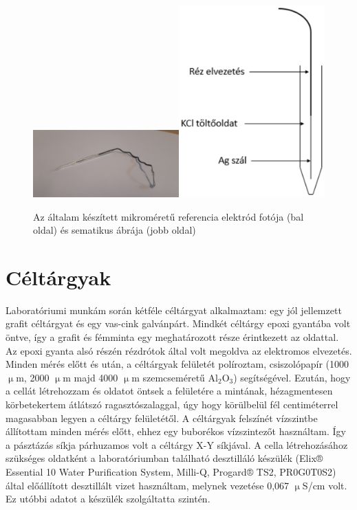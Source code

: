 \begin{figure}
\centering
\includegraphics[width=0.5\textwidth]{img/electrode.eps}\includegraphics[width=0.5\textwidth]{img/electrode1.eps}
\caption{Az általam készített mikroméretű referencia elektród fotója (bal oldal) és sematikus ábrája (jobb oldal)}
\label{fig:electrode}
\end{figure}

\section{Céltárgyak}

Laboratóriumi munkám során kétféle céltárgyat alkalmaztam: egy jól jellemzett grafit céltárgyat és egy vas-cink galvánpárt. Mindkét céltárgy epoxi gyantába volt öntve, így a grafit és fémminta egy meghatározott része érintkezett az oldattal. Az epoxi gyanta alsó részén rézdrótok által volt megoldva az elektromos elvezetés. Minden mérés előtt és után, a céltárgyak felületét políroztam, csiszolópapír (1000 $\upmu$m, 2000 $\upmu$m majd 4000 $\upmu$m szemcseméretű Al$_2$O$_3$) segítségével. Ezután, hogy a cellát létrehozzam és oldatot öntsek a felületére a mintának, hézagmentesen körbetekertem átlátszó ragasztószalaggal, úgy hogy körülbelül fél centiméterrel magasabban legyen a céltárgy felületétől. A céltárgyak felszínét vízszintbe állítottam minden mérés előtt, ehhez egy buborékos vízszintezőt használtam. Így a pásztázás síkja párhuzamos volt a céltárgy X-Y síkjával. A cella létrehozásához szükséges oldatként a laboratóriumban található desztilláló készülék (Elix® Essential 10 Water Purification System, Milli-Q, Progard® TS2, PR0G0T0S2) által előállított desztillált vizet használtam, melynek vezetése 0,067 $\upmu$S/cm volt. Ez utóbbi adatot a készülék szolgáltatta szintén. 

